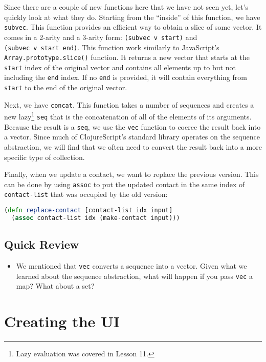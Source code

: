 \documentclass[10pt,twoside,openright]{memoir}
\begin{document}
Since there are a couple of new functions here that we have not seen
yet, let's quickly look at what they do. Starting from the ``inside'' of
this function, we have \texttt{subvec}. This function provides an
efficient way to obtain a slice of some vector. It comes in a 2-arity
and a 3-arity form: \texttt{(subvec\ v\ start)} and
\texttt{(subvec\ v\ start\ end)}. This function work similarly to
JavaScript's \texttt{Array.prototype.slice()} function. It returns a new
vector that starts at the \texttt{start} index of the original vector
and contains all elements up to but not including the \texttt{end}
index. If no \texttt{end} is provided, it will contain everything from
\texttt{start} to the end of the original vector.

Next, we have \texttt{concat}. This function takes a number of sequences
and creates a new lazy\footnote{Lazy evaluation was covered in
Lesson 11.} \texttt{seq} that is the concatenation of all of the elements of
its arguments. Because the result is a \texttt{seq}, we use the
\texttt{vec} function to coerce the result back into a vector. Since
much of ClojureScript's standard library operates on the sequence
abstraction, we will find that we often need to convert the result back
into a more specific type of collection.

Finally, when we update a contact, we want to replace the previous version. This can be done by using \texttt{assoc} to put the updated contact in the same index of \texttt{contact-list} that was occupied by the old version:

\begin{lstlisting}[language=Clojure]
(defn replace-contact [contact-list idx input]
  (assoc contact-list idx (make-contact input)))
\end{lstlisting}

\subsection{Quick Review}

\begin{itemize}
\tightlist
\item
  We mentioned that \texttt{vec} converts a sequence into a vector.
  Given what we learned about the sequence abstraction, what will happen
  if you pass \texttt{vec} a map? What about a set?
\end{itemize}


\section{Creating the UI}
\end{document}
